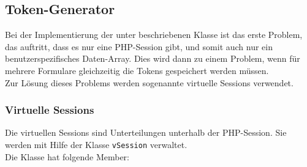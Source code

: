 \subsection{Token-Generator}
\label{sec:content_imple_hashgenerator}
Bei der Implementierung der unter  beschriebenen Klasse ist das erste Problem, das auftritt, dass es nur eine PHP-Session gibt, und somit auch nur ein benutzerspezifisches Daten-Array. Dies wird dann zu einem Problem, wenn für mehrere Formulare gleichzeitig die Tokens gespeichert werden müssen.\\
Zur Lösung dieses Problems werden sogenannte virtuelle Sessions verwendet.

\subsubsection{Virtuelle Sessions}
Die virtuellen Sessions sind Unterteilungen unterhalb der PHP-Session. Sie werden mit Hilfe der Klasse \texttt{vSession} verwaltet.\\
Die Klasse hat folgende Member:
